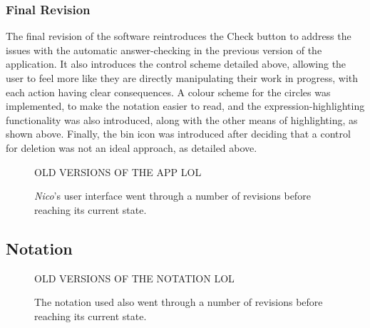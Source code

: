 \documentclass[12pt,twoside,notitlepage,xetex]{report}
\begin{document}
\subsubsection{Final Revision}
The final revision of the software reintroduces the {\sfapp Check}
button to address the issues with the automatic answer-checking in the
previous version of the application.  It also introduces the control scheme
detailed above, allowing the user to feel more like they are directly
manipulating their work in progress, with each action having clear
consequences.  A colour scheme for the circles was implemented, to make the
notation easier to read, and the expression-highlighting functionality was also
introduced, along with the other means of highlighting, as shown above.
Finally, the bin icon was introduced after deciding that a control for deletion
was not an ideal approach, as detailed above.

\begin{center}
\begin{figure}[H]
\begin{center}
{\Huge \sfapp OLD VERSIONS OF THE APP LOL}
\end{center}
\caption{\emph{Nico}'s user interface went through a number of revisions before reaching its current state.}
\label{fig:OldApps}
\end{figure}
\end{center}

\subsection{Notation}%

\begin{center}
\begin{figure}[H]
\begin{center}
{\Huge \sfapp OLD VERSIONS OF THE NOTATION LOL}
\end{center}
\caption{The notation used also went through a number of revisions before reaching its current state.}
\label{fig:OldNots}
\end{figure}
\end{center}
\end{document}
